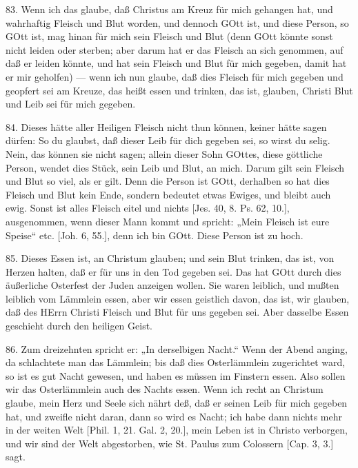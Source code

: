83. Wenn ich das glaube, daß Christus am Kreuz für mich gehangen hat, und wahrhaftig Fleisch und Blut worden, und dennoch GOtt ist, und diese Person, so GOtt ist, mag hinan für mich sein Fleisch und Blut (denn GOtt könnte sonst nicht leiden oder sterben; aber darum hat er das Fleisch an sich genommen, auf daß er leiden könnte, und hat sein Fleisch und Blut für mich gegeben, damit hat er mir geholfen) — wenn ich nun glaube, daß dies Fleisch für mich gegeben und geopfert sei am Kreuze, das heißt essen und trinken, das ist,
glauben, Christi Blut und Leib sei für mich gegeben.

84. Dieses hätte aller Heiligen Fleisch nicht thun können, keiner hätte sagen dürfen: So du glaubst, daß dieser Leib für dich gegeben sei, so wirst du selig. Nein, das können sie nicht sagen; allein dieser Sohn GOttes, diese göttliche Person, wendet dies Stück, sein Leib und Blut, an mich. Darum gilt sein Fleisch und Blut so viel, als er gilt. Denn die Person ist GOtt, derhalben so hat dies Fleisch und Blut kein Ende, sondern bedeutet etwas Ewiges, und bleibt auch ewig. Sonst ist alles Fleisch eitel und nichts [Jes. 40, 8. Ps. 62, 10.], ausgenommen, wenn dieser Mann kommt und spricht: „Mein Fleisch ist eure Speise“ etc. [Joh. 6, 55.], denn ich bin GOtt. Diese Person ist zu hoch.

85. Dieses Essen ist, an Christum glauben; und sein Blut trinken, das ist, von Herzen halten, daß er für uns in den Tod gegeben sei. Das hat GOtt durch dies äußerliche Osterfest der Juden anzeigen wollen. Sie waren leiblich, und mußten leiblich vom Lämmlein essen, aber wir essen geistlich davon, das ist, wir glauben, daß des HErrn Christi Fleisch und Blut für uns gegeben sei. Aber dasselbe Essen geschieht durch den heiligen Geist.

86. Zum dreizehnten spricht er: „In derselbigen Nacht.“ Wenn der Abend anging, da schlachtete man das Lämmlein; bis daß dies Osterlämmlein zugerichtet ward, so ist es gut Nacht gewesen, und haben es müssen im Finstern essen. Also sollen wir das Osterlämmlein auch des Nachts essen. Wenn ich recht an Christum glaube, mein Herz und Seele sich nährt deß, daß er seinen Leib für mich gegeben hat, und zweifle nicht daran, dann so wird es Nacht; ich habe dann nichts mehr in der weiten Welt [Phil. 1, 21. Gal. 2, 20.], mein Leben ist in Christo verborgen, und wir sind der Welt abgestorben, wie St. Paulus zum Colossern [Cap. 3, 3.] sagt.

